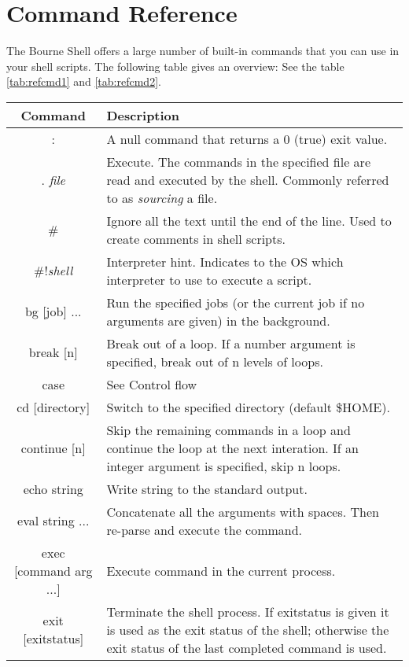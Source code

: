 \section{Command Reference}

The Bourne Shell offers a large number of built-in commands that you can use in
your shell scripts. The following table gives an overview: See the table \ref{tab:refcmd1} and \ref{tab:refcmd2}.

\begin{table*}[H]
	\begin{tabular}{|c|p{10cm}|}
		\hline
		\textbf{ Command} & \textbf{ Description} \\ \hline
		 : &  A null command that returns a 0 (true) exit value. \\ \hline
		 . \emph{file} &  Execute. The commands in the specified file are read and executed by the shell. Commonly referred to as \emph{sourcing} a file. \\ \hline
		 \# &  Ignore all the text until the end of the line. Used to create comments in shell scripts. \\ \hline
		 \#!\emph{shell} &  Interpreter hint. Indicates to the OS which interpreter to use to execute a script. \\ \hline
		 bg [job] ... &  Run the specified jobs (or the current job if no arguments are given) in the background. \\ \hline
		 break [n] &  Break out of a loop. If a number argument is specified, break out of n levels of loops. \\ \hline
		 case &  See Control flow \\ \hline
		 cd [directory] &  Switch to the specified directory (default \$HOME). \\ \hline
		 continue [n] &  Skip the remaining commands in a loop and continue the loop at the next interation. If an integer argument is specified, skip n loops. \\ \hline
		 echo string &  Write string to the standard output. \\ \hline
		 eval string ... &  Concatenate all the arguments with spaces. Then re-parse and execute the command. \\ \hline
		 exec [command arg ...] &  Execute command in the current process. \\ \hline
		 exit [exitstatus] &  Terminate the shell process. If exitstatus is given it is used as the exit status of the shell; otherwise the exit status of the last completed command is used. \\ \hline

\end{tabular}
\end{table*}

